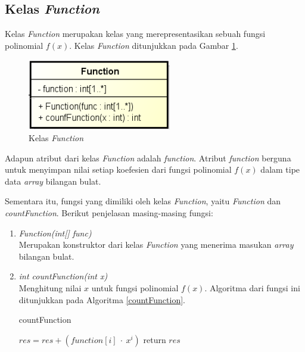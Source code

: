\subsection{Kelas \textit{Function}}

Kelas \textit{Function} merupakan kelas yang merepresentasikan sebuah fungsi polinomial \begin{math}f(x)\end{math}. Kelas \textit{Function} ditunjukkan pada Gambar \ref{fig:classfunction}.

\begin{figure}[H]
	\centering
	\includegraphics[scale=0.7]{Gambar/class_function}
	\caption{Kelas \textit{Function}}\label{fig:classfunction}
\end{figure}

Adapun atribut dari kelas \textit{Function} adalah \textit{function}. Atribut \textit{function} berguna untuk menyimpan nilai setiap koefesien dari fungsi polinomial \begin{math}f(x)\end{math} dalam tipe data \textit{array} bilangan bulat.

Sementara itu, fungsi yang dimiliki oleh kelas \textit{Function}, yaitu \textit{Function} dan \textit{countFunction}. Berikut penjelasan masing-masing fungsi:

\begin{enumerate}
	\item \textit{Function(int[] func)} \\
	Merupakan konstruktor dari kelas \textit{Function} yang menerima masukan \textit{array} bilangan bulat.
	\item \textit{int countFunction(int x)} \\
	Menghitung nilai \begin{math}x\end{math} untuk fungsi polinomial \begin{math}f(x)\end{math}. Algoritma dari fungsi ini ditunjukkan pada Algoritma \ref{countFunction}.
	\begin{algorithm}
		\caption{countFunction}
		\label{countFunction}
		\begin{algorithmic}[1]
					\State \begin{math}res = res + (function[i]\: \cdot\: x^i)\end{math}
				\EndFor
				\State return \begin{math}res\end{math}
			\EndFunction
		\end{algorithmic}
	\end{algorithm}
\end{enumerate}


